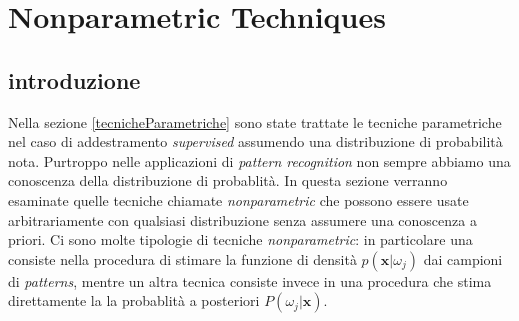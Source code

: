 %
%
%

\chapter{Nonparametric Techniques}\label{metodinonparametrici}

\section{introduzione}
Nella sezione \ref{tecnicheParametriche} sono state trattate  le tecniche parametriche nel caso di addestramento \emph{supervised} assumendo una distribuzione di probabilità nota. Purtroppo nelle applicazioni di \emph{pattern recognition} non sempre abbiamo una conoscenza della distribuzione di probablità. In questa sezione verranno esaminate quelle tecniche chiamate \emph{nonparametric} che possono essere usate arbitrariamente con qualsiasi distribuzione senza assumere una conoscenza a priori. Ci sono molte tipologie di tecniche \emph{nonparametric}: in particolare una consiste nella procedura di stimare la funzione di densità $p(\mathbf{x}|\omega_j)$ dai campioni di \emph{patterns}, mentre un altra tecnica consiste invece in una procedura che stima direttamente la la probablità a posteriori $P(\omega_j|\mathbf{x})$.

